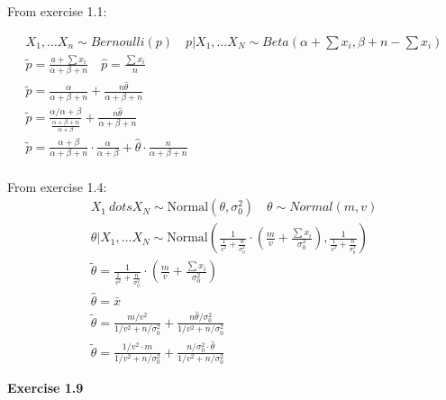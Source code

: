 \documentclass[12pt]{article}
\begin{document}
    From exercise 1.1:

    \begin{gather*}
        X_1, \dots X_n \sim Bernoulli(p) \quad p|X_1, \dots X_N \sim Beta(\alpha + \sum x_i, \beta + n - \sum x_i) \\
        \tilde{p} = \frac{a + \sum x_i}{\alpha + \beta + n} \quad \hat{p} = \frac{\sum x_i}{n} \\
        \tilde{p} = \frac{\alpha}{\alpha + \beta + n} + \frac{n \hat{\theta}}{\alpha + \beta + n} \\
        \tilde{p} = \frac{\alpha / \alpha + \beta}{\frac{\alpha + \beta + n}{\alpha + \beta}} +
           \frac{n \hat{\theta}}{\alpha + \beta + n} \\
        \tilde{p}   = \frac{\alpha + \beta}{\alpha + \beta +n} \cdot \frac{\alpha}{\alpha + \beta} +
           \hat{\theta} \cdot \frac{n}{\alpha + \beta + n}
    \end{gather*} \\

    From exercise 1.4: \\

    \begin{gather*}
        X_1\ dots X_N \sim \text{Normal}(\theta, \sigma_0 ^2) \quad   \theta \sim Normal(m, v) \\
        \theta | X_1, \dots X_N \sim
            \text{Normal}(\frac{1}{\frac{1}{v^2} + \frac{n}{\sigma_0 ^2}}
                  \cdot (\frac{m}{v} + \frac{\sum x_i}{\sigma_0 ^2}),
        \frac{1}{\frac{1}{v^2} + \frac{n}{\sigma_0 ^2}} ) \\
        \tilde{\theta} = \frac{1}{\frac{1}{v^2} + \frac{n}{\sigma_0 ^2}}
                      \cdot (\frac{m}{v} + \frac{\sum x_i}{\sigma_0 ^2}) \\
        \hat{\theta} = \bar{x} \\
        \tilde{\theta} = \frac{m/v^2}{1/v^2 + n/\sigma_0 ^2} +
                  \frac{n \hat{\theta} / \sigma_0 ^2}{1/v^2 + n/\sigma_0 ^2} \\
        \tilde{\theta} = \frac{1/v^2 \cdot m}{1/v^2 + n/\sigma_0 ^2} +
                  \frac{n / \sigma_0 ^2 \cdot \hat{\theta}}{1/v^2 + n/\sigma_0 ^2}
    \end{gather*}

    \noindent \textbf{Exercise 1.9}

       
\end{document}

